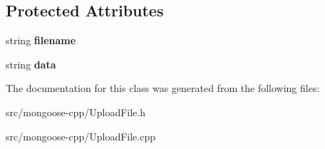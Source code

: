 \subsection*{Protected Attributes}
\begin{DoxyCompactItemize}
\item 
string {\bfseries filename}\hypertarget{classMongoose_1_1UploadFile_af4ecff7aac4b5620ecf5885f725330d3}{}\label{classMongoose_1_1UploadFile_af4ecff7aac4b5620ecf5885f725330d3}

\item 
string {\bfseries data}\hypertarget{classMongoose_1_1UploadFile_a75a99ddcecf4d4724e198a60b66a0a92}{}\label{classMongoose_1_1UploadFile_a75a99ddcecf4d4724e198a60b66a0a92}

\end{DoxyCompactItemize}


The documentation for this class was generated from the following files\+:\begin{DoxyCompactItemize}
\item 
src/mongoose-\/cpp/Upload\+File.\+h\item 
src/mongoose-\/cpp/Upload\+File.\+cpp\end{DoxyCompactItemize}

